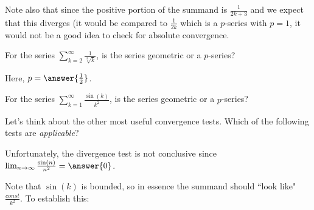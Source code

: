 \documentclass{ximera}
\begin{document}
\begin{exercise}
\begin{hint}
\begin{question}
Note also that since the positive portion of the summand is $\frac{1}{2k+3}$ and we expect that this diverges (it would be compared to $\frac{1}{2k}$ which is a $p$-series with $p=1$, it would not be a good idea to check for absolute convergence.

\end{question}

\begin{question}
For the series $\sum_{k=2}^{\infty} \frac{1}{\sqrt[3]{k}}$, is the series geometric or a $p$-series?

\begin{multipleChoice}
\end{multipleChoice}

Here, $p= \answer{\frac{1}{2}}$. 
\end{question}

\begin{question}

For the series $\sum_{k=1}^{\infty} \frac{\sin(k)}{k^2}$, is the series geometric or a $p$-series?

\begin{multipleChoice}
\end{multipleChoice}

Let's think about the other most useful convergence tests.  Which of the following tests are \emph{applicable}?

\begin{selectAll}
\end{selectAll}

Unfortunately, the divergence test is not conclusive since $\lim_{n \to \infty} \frac{\sin(n)}{n^2} = \answer{0}$.  

Note that $\sin(k)$ is bounded, so in essence the summand should ``look like" $\frac{const}{k^2}$.  To establish this:

\begin{multipleChoice}
\end{multipleChoice} 


\end{question}
\end{hint}
\end{exercise}
\end{document}
